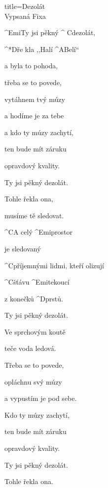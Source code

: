\begin{song}{title=\predtitle\centering Dezolát\\\large Vypsaná Fixa \vspace*{-0.3cm}}  %
\begin{centerjustified}
\nejvetsi

\begin{varwidth}[t]{0.48\textwidth}\setlength{\parindent}{0.45cm}  %

\sloka
	^{Emi}Ty jsi pěkný ^{\,\,C}dezolát,
	
	^*{D}ře kla ,,Halí ^{A}Belí`` 
	
	a byla to pohoda,
	
	třeba se to povede, 
	
	vytáhnem tvý múzy 
	
	a hodíme je za tebe 
	
	a kdo ty múzy zachytí, 

	ten bude mít záruku 
	
	opravdový kvality.
	
	Ty jsi pěkný dezolát.
	
	Tohle řekla ona, 
	
	musíme tě sledovat.
	
	^{C}A celý ^{Emi}prostor 
	
	je sledovaný
	
	^{C}příjemnými lidmi, kteří olizují 
	
	^{C}šťávu ^{Emi}tekoucí 
	
	z konečků ^{D}prstů.
	
\sloka
	Ty jsi pěkný dezolát.
	
	Ve sprchovým koutě 
	
	teče voda ledová.
	
	Třeba se to povede,
	
	opláchnu svý múzy 
	
	a vypustím je pod sebe. 
	
	Kdo ty múzy zachytí, 
	
	ten bude mít záruku 
	
	opravdový kvality. 
	
	Ty jsi pěkný dezolát. 
	
	Tohle řekla ona.
	
	
\end{varwidth}\mezisloupci\begin{varwidth}[t]{0.48\textwidth}\setlength{\parindent}{0.45cm}%


\end{varwidth}
\end{centerjustified}
\end{song}
